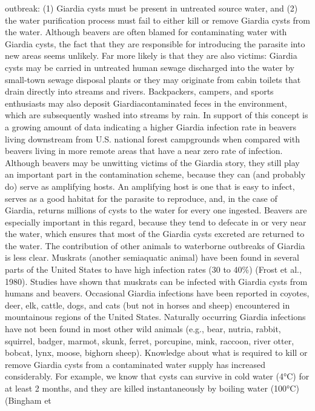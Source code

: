 \documentclass{article}
\begin{document}
outbreak: (1) Giardia cysts must be present in untreated source water,
and (2) the water purification process must fail to either kill or
remove Giardia cysts from the water. Although beavers are often blamed
for contaminating water with Giardia cysts, the fact that they are
responsible for introducing the parasite into new areas seems unlikely.
Far more likely is that they are also victims: Giardia cysts may be
carried in untreated human sewage discharged into the water by
small-town sewage disposal plants or they may originate from cabin
toilets that drain directly into streams and rivers. Backpackers,
campers, and sports enthusiasts may also deposit Giardiacontaminated
feces in the environment, which are subsequently washed into streams by
rain. In support of this concept is a growing amount of data indicating
a higher Giardia infection rate in beavers living downstream from U.S.
national forest campgrounds when compared with beavers living in more
remote areas that have a near zero rate of infection. Although beavers
may be unwitting victims of the Giardia story, they still play an
important part in the contamination scheme, because they can (and
probably do) serve as amplifying hosts. An amplifying host is one that
is easy to infect, serves as a good habitat for the parasite to
reproduce, and, in the case of Giardia, returns millions of cysts to the
water for every one ingested. Beavers are especially important in this
regard, because they tend to defecate in or very near the water, which
ensures that most of the Giardia cysts excreted are returned to the
water. The contribution of other animals to waterborne outbreaks of
Giardia is less clear. Muskrats (another semiaquatic animal) have been
found in several parts of the United States to have high infection rates
(30 to 40\%) (Frost et al., 1980). Studies have shown that muskrats can
be infected with Giardia cysts from humans and beavers. Occasional
Giardia infections have been reported in coyotes, deer, elk, cattle,
dogs, and cats (but not in horses and sheep) encountered in mountainous
regions of the United States. Naturally occurring Giardia infections
have not been found in most other wild animals (e.g., bear, nutria,
rabbit, squirrel, badger, marmot, skunk, ferret, porcupine, mink,
raccoon, river otter, bobcat, lynx, moose, bighorn sheep). Knowledge
about what is required to kill or remove Giardia cysts from a
contaminated water supply has increased considerably. For example, we
know that cysts can survive in cold water (4°C) for at least 2 months,
and they are killed instantaneously by boiling water (100°C) (Bingham et
\end{document}
